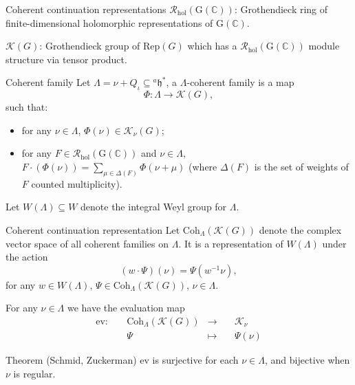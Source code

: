 \documentclass[fleqn,xcolor=dvipsnames]{beamer}
\newcommand{\BC}{{\mathbb {C}}}
\newcommand{\CK}{{\mathcal {K}}}
\newcommand{\CR}{{\mathcal {R}}}
\newcommand{\RG}{{\mathrm {G}}}
\newcommand{\fh}{\mathfrak{h}}
\newcommand{\Rep}{{\mathrm{Rep}}}
\newcommand{\defmap}[5]{
           \begin{equation*}
              \begin{aligned}
                   #1:\quad  & #2 &\longrightarrow &\quad #3 \\
                      \quad  & #4    &\longmapsto  &\quad #5
              \end{aligned}
           \end{equation*}
          }
\begin{document}
\begin{frame}{Coherent continuation representations}
  $\CR_{\mathrm{hol}}(\RG(\BC))$: Grothendieck ring of finite-dimensional holomorphic representations of $\RG(\BC)$.\par
  \pause$\CK(G)$: Grothendieck group of $\Rep(G)$ which has a $\CR_{\mathrm{hol}}(\RG(\BC))$ module structure via tensor product.
  \pause\begin{block}{Coherent family}
    Let $\Lambda = \nu + Q_{\iota} \subseteq {^{a}\fh}^*$, a \alert{$\Lambda$-coherent family}  is a map
   $$\Phi: \Lambda \to \CK(G),$$
   such that:
   \begin{itemize}
      \item for any $\nu \in \Lambda$, $\Phi(\nu) \in \CK_{\nu}(G)$;
      \item for any $F \in \CR_{\mathrm{hol}}(\RG(\BC))$ and $\nu \in \Lambda$, $F \cdot (\Phi(\nu)) = \sum_{\mu \in \Delta(F)} \Phi(\nu + \mu)$ (where $\Delta(F)$ is the set of weights of $F$ counted multiplicity).
   \end{itemize}
  \end{block}
\end{frame}






\begin{frame}
  Let $W(\Lambda) \subseteq W$ denote the integral Weyl group for $\Lambda$.
  \pause\begin{block}{Coherent continuation representation}
  Let $\mathrm{Coh}_{\Lambda}(\CK(G))$ denote the complex vector space of all coherent families on $\Lambda$. It is a representation of $W(\Lambda)$ under the action
  \[(w \cdot \Psi)(\nu) = \Psi(w^{-1}\nu),\]
  for any $w \in W(\Lambda)$, $\Psi \in \mathrm{Coh}_{\Lambda}(\CK(G))$, $\nu \in \Lambda$.
  \end{block}
    \pause For any $\nu \in \Lambda$ we have the evaluation map \defmap{\mathrm{ev}}{\mathrm{Coh}_{\Lambda}(\CK(G))}{\CK_{\nu}}{\Psi}{\Psi(\nu)}
  \pause\begin{block}{Theorem (Schmid, Zuckerman)}
    $\mathrm{ev}$ is surjective for each $\nu \in \Lambda$, and bijective when $\nu$ is regular.
  \end{block}

\end{frame}
\end{document}
